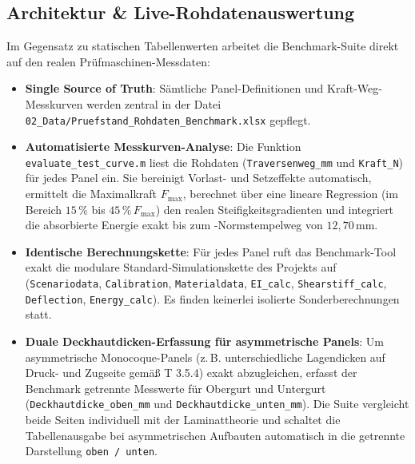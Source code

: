 \subsection*{Architektur \& Live-Rohdatenauswertung}
Im Gegensatz zu statischen Tabellenwerten arbeitet die Benchmark-Suite direkt auf den realen Prüfmaschinen-Messdaten:
\begin{itemize}
    \item \textbf{Single Source of Truth}: Sämtliche Panel-Definitionen und Kraft-Weg-Messkurven werden zentral in der Datei \texttt{02\_Data/\allowbreak Pruefstand\_Rohdaten\_Benchmark.xlsx} gepflegt.
    \item \textbf{Automatisierte Messkurven-Analyse}: Die Funktion \texttt{evaluate\_test\_curve.m} liest die Rohdaten (\texttt{Traversenweg\_mm} und \texttt{Kraft\_N}) für jedes Panel ein. Sie bereinigt Vorlast- und Setzeffekte automatisch, ermittelt die Maximalkraft $F_{\max}$, berechnet über eine lineare Regression (im Bereich $15\,\%$ bis $45\,\% \, F_{\max}$) den realen Steifigkeitsgradienten und integriert die absorbierte Energie exakt bis zum -Normstempelweg von $12{,}70\,\text{mm}$.
    \item \textbf{Identische Berechnungskette}: Für jedes Panel ruft das Benchmark-Tool exakt die modulare Standard-Simulationskette des Projekts auf (\texttt{Scenariodata}, \allowbreak \texttt{Calibration}, \allowbreak \texttt{Materialdata}, \allowbreak \texttt{EI\_calc}, \allowbreak \texttt{Shearstiff\_calc}, \allowbreak \texttt{Deflection}, \allowbreak \texttt{Energy\_calc}). Es finden keinerlei isolierte Sonderberechnungen statt.
    \item \textbf{Duale Deckhautdicken-Erfassung für asymmetrische Panels}: Um asymmetrische Monocoque-Panels (z.\,B. unterschiedliche Lagendicken auf Druck- und Zugseite gemäß  T 3.5.4) exakt abzugleichen, erfasst der Benchmark getrennte Messwerte für Obergurt und Untergurt (\texttt{Deckhautdicke\_oben\_mm} und \texttt{Deckhautdicke\_unten\_mm}). Die Suite vergleicht beide Seiten individuell mit der Laminattheorie und schaltet die Tabellenausgabe bei asymmetrischen Aufbauten automatisch in die getrennte Darstellung \texttt{oben / unten}.
\end{itemize}

